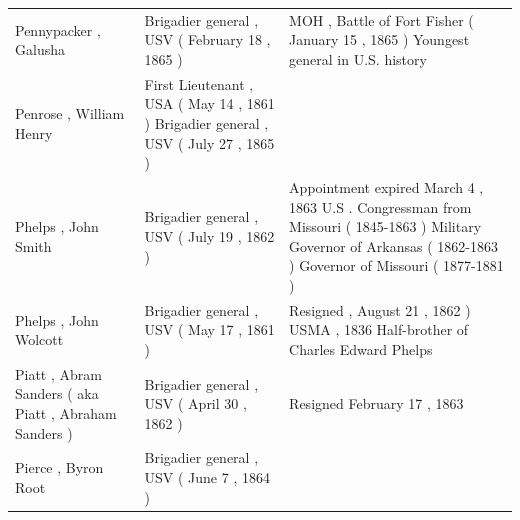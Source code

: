 \documentclass{article}
\begin{document}
\begin{tabular}{lll}
Pennypacker , Galusha & Brigadier general , USV ( February 18 , 1865 ) & MOH , Battle of Fort Fisher ( January 15 , 1865 ) Youngest general in U.S. history \\
Penrose , William Henry & First Lieutenant , USA ( May 14 , 1861 ) Brigadier general , USV ( July 27 , 1865 ) &  \\
Phelps , John Smith & Brigadier general , USV ( July 19 , 1862 ) & Appointment expired March 4 , 1863 U.S . Congressman from Missouri ( 1845-1863 ) Military Governor of Arkansas ( 1862-1863 ) Governor of Missouri ( 1877-1881 ) \\
Phelps , John Wolcott & Brigadier general , USV ( May 17 , 1861 ) & Resigned , August 21 , 1862 ) USMA , 1836 Half-brother of Charles Edward Phelps \\
Piatt , Abram Sanders ( aka Piatt , Abraham Sanders ) & Brigadier general , USV ( April 30 , 1862 ) & Resigned February 17 , 1863 \\
Pierce , Byron Root & Brigadier general , USV ( June 7 , 1864 ) &  \\
\bottomrule
\end{tabular}
\end{document}
